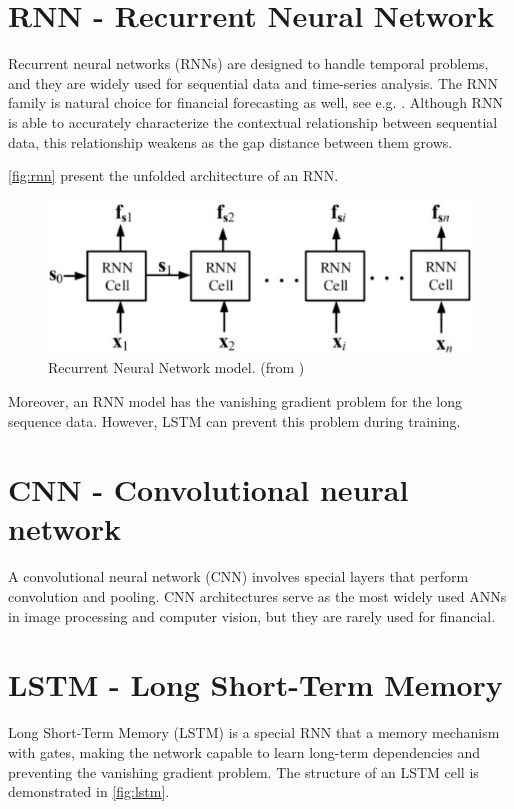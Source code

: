 \section{RNN - Recurrent Neural Network}

Recurrent neural networks (RNNs)
are designed to handle temporal
problems, and they are widely used
for sequential data and time-series
analysis. The RNN family is natural
choice for financial forecasting as
well, see e.g. \cite{Rumelhart1986}. Although RNN is able to accurately characterize the contextual relationship between sequential
data, this relationship weakens as the gap distance between them grows.

\autoref{fig:rnn} present the unfolded architecture of an RNN.

\begin{figure}[H]
	\centering
	\includegraphics[width=1\linewidth]{images/rnn.eps}
	\caption{Recurrent Neural Network model. (from \cite{pic4rnn})}
	\label{fig:rnn}
\end{figure}

Moreover, an RNN model has the vanishing gradient problem for the long sequence
data. However, LSTM can prevent this problem during training.

\section{CNN - Convolutional neural network}

A convolutional
neural network (CNN) involves
special layers that perform
convolution and pooling. CNN
architectures serve as the most
widely used ANNs in image
processing and computer vision, but they are rarely used for financial.

\section{LSTM - Long Short-Term Memory}
Long Short-Term Memory (LSTM) is a special RNN that a memory mechanism with gates, making the network capable to learn long-term dependencies and preventing the vanishing gradient problem. The structure of an LSTM cell is demonstrated in \autoref{fig:lstm}.

